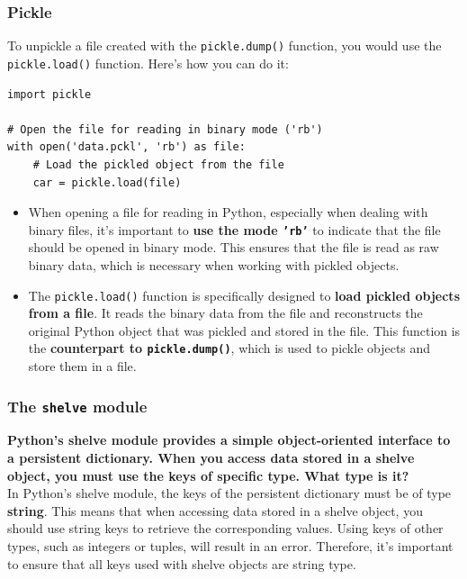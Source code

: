 \subsubsection{Pickle}
To unpickle a file created with the \texttt{pickle.dump()} function, you would use the \texttt{pickle.load()} function. Here's how you can do it:

\begin{codebox}
\begin{verbatim}
import pickle

# Open the file for reading in binary mode ('rb')
with open('data.pckl', 'rb') as file:
    # Load the pickled object from the file
    car = pickle.load(file)
\end{verbatim}
\end{codebox}

\begin{itemize}
    \item When opening a file for reading in Python, especially when dealing with binary files, it's important to \textbf{use the mode \texttt{'rb'}} to indicate that the file should be opened in binary mode. This ensures that the file is read as raw binary data, which is necessary when working with pickled objects.
    \item The \texttt{pickle.load()} function is specifically designed to \textbf{load pickled objects from a file}. It reads the binary data from the file and reconstructs the original Python object that was pickled and stored in the file. This function is the \textbf{counterpart to \texttt{pickle.dump()}}, which is used to pickle objects and store them in a file.
\end{itemize}

\subsubsection{The \texttt{shelve} module}
\textbf{Python's shelve module provides a simple object-oriented interface to a persistent dictionary. When you access data stored in a shelve object, you must use the keys of specific type. What type is it?}\\

In Python's shelve module, the keys of the persistent dictionary must be of type \textbf{string}. This means that when accessing data stored in a shelve object, you should use string keys to retrieve the corresponding values. Using keys of other types, such as integers or tuples, will result in an error. Therefore, it's important to ensure that all keys used with shelve objects are string type.

